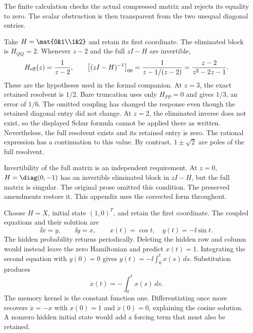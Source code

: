The finite calculation checks the actual compressed matrix and rejects its equality to zero. The scalar obstruction is then transparent from the two unequal diagonal entries.

Take $H=\mat{0&1\\1&2}$ and retain its first coordinate. The eliminated block is $H_{QQ}=2$. Whenever $z-2$ and the full $zI-H$ are invertible,
\[
H_{\rm eff}(z)=\frac1{z-2},\qquad
\bigl[(zI-H)^{-1}\bigr]_{00}
=\frac1{z-1/(z-2)}=\frac{z-2}{z^2-2z-1}.
\]
These are the hypotheses used in the formal companion.
At $z=3$, the exact retained resolvent is $1/2$. Bare truncation uses only $H_{PP}=0$ and gives $1/3$, an error of $1/6$. The omitted coupling has changed the response even though the retained diagonal entry did not change.
At $z=2$, the eliminated inverse does not exist, so the displayed Schur formula cannot be applied there as written. Nevertheless, the full resolvent exists and its retained entry is zero. The rational expression has a continuation to this value. By contrast, $1\pm\sqrt2$ are poles of the full resolvent.

Invertibility of the full matrix is an independent requirement. At $z=0$, $H=\diag(0,-1)$ has an invertible eliminated block in $zI-H$, but the full matrix is singular. The original prose omitted this condition. The preserved amendments restore it. This appendix uses the corrected form throughout.

Choose $H=X$, initial state $(1,0)^T$, and retain the first coordinate. The coupled equations and their solution are
\[
\ii\dot x=y,\qquad \ii\dot y=x,\qquad
x(t)=\cos t,\quad y(t)=-\ii\sin t.
\]
The hidden probability returns periodically. Deleting the hidden row and column would instead leave the zero Hamiltonian and predict $x(t)=1$.
Integrating the second equation with $y(0)=0$ gives $y(t)=-\ii\int_0^tx(s)\,ds$. Substitution produces
\[
\dot x(t)=-\int_0^tx(s)\,ds.
\]
The memory kernel is the constant function one. Differentiating once more recovers $\ddot x=-x$ with $x(0)=1$ and $\dot x(0)=0$, explaining the cosine solution. A nonzero hidden initial state would add a forcing term that must also be retained.

